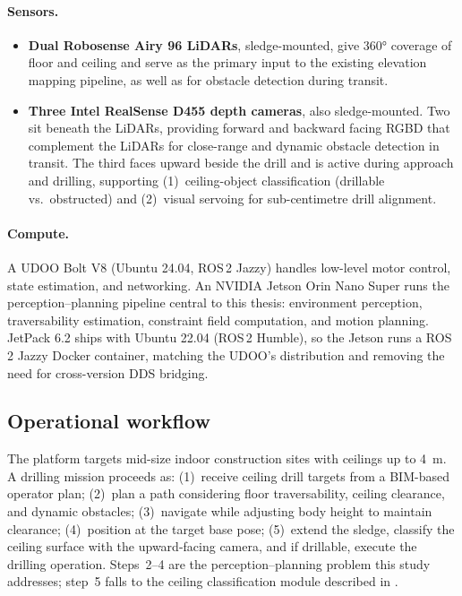 \documentclass[11pt,a4paper]{article}
\begin{document}
\paragraph{Sensors.}
\begin{itemize}[nosep]
    \item \textbf{Dual Robosense Airy 96 LiDARs}, sledge-mounted, give
    \ang{360} coverage of floor and ceiling and serve as the primary input to the existing elevation mapping pipeline, as well as for obstacle detection during transit.
    \item \textbf{Three Intel RealSense D455 depth cameras}, also sledge-mounted. Two sit beneath the LiDARs, providing forward and backward facing RGBD that complement the LiDARs for close-range and dynamic obstacle detection in transit. The third faces upward beside the drill and is active during approach and drilling, supporting (1)~ceiling-object classification (drillable vs.\ obstructed) and (2)~visual servoing for sub-centimetre drill alignment.
\end{itemize}

\paragraph{Compute.}
A UDOO Bolt V8 (Ubuntu 24.04, ROS\,2 Jazzy) handles low-level motor control, state estimation, and networking. An NVIDIA Jetson Orin Nano Super runs the perception--planning pipeline central to this thesis: environment perception, traversability estimation, constraint field computation, and motion planning. JetPack 6.2 ships with Ubuntu 22.04 (ROS\,2 Humble), so the Jetson runs a ROS\,2 Jazzy Docker container, matching the UDOO's distribution and removing the need for cross-version DDS bridging.

\subsection{Operational workflow}
\label{sec:operational-workflow}
The platform targets mid-size indoor construction sites with ceilings up to \SI{4}{\metre}. A drilling mission proceeds as: (1)~receive ceiling drill targets from a BIM-based operator plan; (2)~plan a path considering floor traversability, ceiling clearance, and dynamic obstacles; (3)~navigate while adjusting body height to maintain clearance; (4)~position at the target base pose; (5)~extend the sledge, classify the ceiling surface with the upward-facing camera, and if drillable, execute the drilling operation. Steps~2--4 are the perception--planning problem this study addresses; step~5 falls to the ceiling classification module described in .
\end{document}
